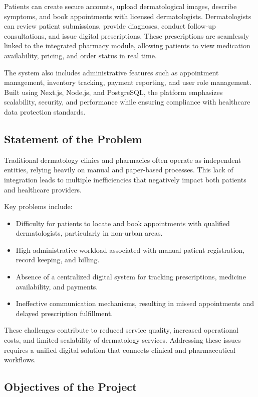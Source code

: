 \documentclass[12pt,a4paper]{report}
\begin{document}
Patients can create secure accounts, upload dermatological images, describe symptoms, and book appointments with licensed dermatologists. Dermatologists can review patient submissions, provide diagnoses, conduct follow-up consultations, and issue digital prescriptions. These prescriptions are seamlessly linked to the integrated pharmacy module, allowing patients to view medication availability, pricing, and order status in real time.

The system also includes administrative features such as appointment management, inventory tracking, payment reporting, and user role management. Built using Next.js, Node.js, and PostgreSQL, the platform emphasizes scalability, security, and performance while ensuring compliance with healthcare data protection standards.



\subsection{Statement of the Problem}
Traditional dermatology clinics and pharmacies often operate as independent entities, relying heavily on manual and paper-based processes. This lack of integration leads to multiple inefficiencies that negatively impact both patients and healthcare providers.

Key problems include:
\begin{itemize}
    \item Difficulty for patients to locate and book appointments with qualified dermatologists, particularly in non-urban areas.
    \item High administrative workload associated with manual patient registration, record keeping, and billing.
    \item Absence of a centralized digital system for tracking prescriptions, medicine availability, and payments.
    \item Ineffective communication mechanisms, resulting in missed appointments and delayed prescription fulfillment.
\end{itemize}

These challenges contribute to reduced service quality, increased operational costs, and limited scalability of dermatology services. Addressing these issues requires a unified digital solution that connects clinical and pharmaceutical workflows.



\subsection{Objectives of the Project}
\end{document}
